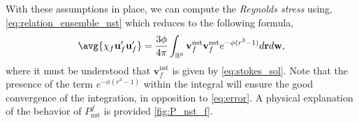 With these assumptions in place, we can compute the \textit{Reynolds stress} using, \ref{eq:relation_ensemble_nst} which reduces to the following formula, 
\begin{equation}
    \avg{\chi_f \textbf{u}_f'\textbf{u}_f'}
    = 
    \frac{3\phi}{4\pi}
    \int_{\mathbb{R}^6}
    \textbf{v}_f^\text{nst}
    \textbf{v}_f^\text{nst}
     e^{-\phi(r^3 -1)}
    d\textbf{r}
    d\textbf{w},
    \label{eq:step_one}
\end{equation}
where it must be understood that $\textbf{v}_f^\text{nst}$ is given by \ref{eq:stokes_sol}. 
Note that the presence of the term $e^{-\phi(r^3 -1)}$ within the integral will ensure the good convergence of the integration, in opposition to \ref{eq:error}. 
A physical explanation of the behavior of $P_\text{nst}^f$ is provided \ref{fig:P_nst_f}. 
\begin{figure}[h!]
    \centering
{}
\end{figure}
